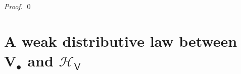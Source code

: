 \documentclass[preprint,12pt]{elsarticle}
\newcommand\Pred{\mathbb{P}}
\newcommand\Demon{{\mathtt{D}}}
\newcommand\Nature{{\mathtt{P}}}
\newcommand\DN{{\Demon\Nature}}
\newcommand\Smyth{{\mathcal Q}}
\newcommand\Hoare{{\mathcal H}}
\newcommand\Vt{\mathsf{V}}
\newcommand\HV{\Hoare_\Vt}
\newcommand\SV{\Smyth_{\Vt}}
\newcommand\Val{{\mathbf V}}
\newcommand\Topcat{\mathbf{Top}}
\begin{document}
\begin{proof}
%
%
%
%
%   
  \qed
\end{proof}


\part{A weak distributive law between $\Val_\bullet$ and $\HV$}
\end{document}
